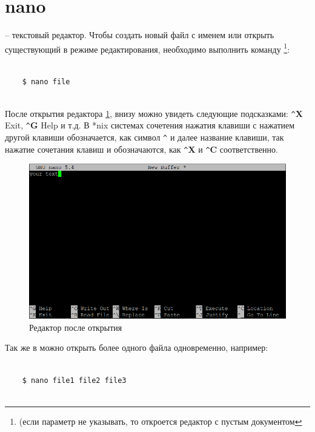 \section{nano}

\noindent
{} -- текстовый редактор. Чтобы создать новый файл с именем  или открыть существующий в режиме редактирования, необходимо выполнить команду \footnote{(если параметр  не указывать, то откроется редактор с пустым документом}:

\begin{lstlisting}
	
	$ nano file
	
\end{lstlisting}	

После открытия редактора  \ref{fig:nano}, внизу можно увидеть следующие подсказками: \verb|^|\textbf{X} Exit, \verb|^|\textbf{G} Help и т.д. В *nix системах сочетения нажатия клавиши  с нажатием другой клавиши обозначается, как символ \verb|^| и далее название клавиши, так нажатие сочетания клавиш  и  обозначаются, как \verb|^|\textbf{X} и \verb|^|\textbf{C} соответственно.

\begin{figure}[h]
\centering
	\includegraphics[width=\textwidth]{img/ch1/nano.png}
	\caption{Редактор  после открытия}
	\label{fig:nano}
\end{figure}

Так же в  можно открыть более одного файла одновременно, например:
\begin{lstlisting}
	
	$ nano file1 file2 file3
	
\end{lstlisting}	

